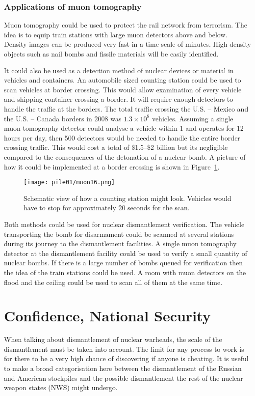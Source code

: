 \documentclass[twoside,titlepage,11pt,twocolumn,a4paper]{article}
\begin{document}
\subsubsection{Applications of muon tomography}
Muon tomography could be used to protect the rail network from
terrorism. The idea is to equip train stations with large muon
detectors above and below. Density images can be produced very fast in
a time scale of minutes. High density objects such as nail bombs and
fissile materials will be easily identified. \citep{nichol}

It could also be used as a detection method of nuclear devices or
material in vehicles and containers.  An automobile sized counting
station could be used to scan vehicles at border crossing. This would
allow examination of every vehicle and shipping container crossing a
border. It will require enough detectors to handle the traffic at the
borders. The total traffic crossing the U.S. -- Mexico and the U.S. --
Canada borders in 2008 was \(1.3\times10^8\) vehicles. Assuming a
single muon tomography detector could analyse a vehicle within
\unit{1}{\minute} and operates for 12 hours per day, then 500
detectors would be needed to handle the entire border crossing
traffic. This would cost a total of \$1.5--\$2 billion but its
negligible compared to the consequences of the detonation of a nuclear
bomb. A picture of how it could be implemented at a border crossing is
shown in Figure~\ref{fig:muon16}. \citep{morris2008}

\begin{figure}
  \texttt{[image: pile01/muon16.png]}
  \caption{Schematic view of how a counting station might
    look. Vehicles would have to stop for approximately 20 seconds for
    the scan. \citep{morris2008}}
  \label{fig:muon16}
\end{figure}

Both methods could be used for nuclear dismantlement verification. The
vehicle transporting the bomb for disarmament could be scanned at
several stations during its journey to the dismantlement facilities. A
single muon tomography detector at the dismantlement facility could be
used to verify a small quantity of nuclear bombs. If there is a large
number of bombs queued for verification then the idea of the train
stations could be used. A room with muon detectors on the flood and
the ceiling could be used to scan all of them at the same time.

\section{Confidence, National Security}
When talking about dismantlement of nuclear warheads, the scale of the
dismantlement must be taken into account. The limit for any process to
work is for there to be a very high chance of discovering if anyone is
cheating. It is useful to make a broad categorisation here between the
dismantlement of the Russian and American stockpiles and the possible
dismantlement the rest of the nuclear weapon states (NWS) might
undergo.
\end{document}
